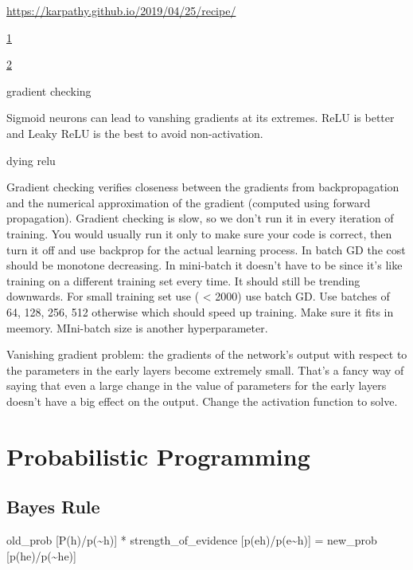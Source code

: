 \documentclass[]{book}
\begin{document}
\url{https://karpathy.github.io/2019/04/25/recipe/}

\href{http://theorangeduck.com/page/neural-network-not-working}{1}

\href{https://towardsdatascience.com/checklist-for-debugging-neural-networks-d8b2a9434f21}{2}

gradient checking

Sigmoid neurons can lead to vanshing gradients at its extremes. ReLU is better and Leaky ReLU is the best to avoid non-activation.

dying relu

Gradient checking verifies closeness between the gradients from backpropagation and the numerical approximation of the gradient (computed using forward propagation). Gradient checking is slow, so we don't run it in every iteration of training. You would usually run it only to make sure your code is correct, then turn it off and use backprop for the actual learning process. In batch GD the cost should be monotone decreasing. In mini-batch it doesn't have to be since it's like training on a different training set every time. It should still be trending downwards. For small training set use ( \textless{} 2000) use batch GD. Use batches of 64, 128, 256, 512 otherwise which should speed up training. Make sure it fits in meemory. MIni-batch size is another hyperparameter.

Vanishing gradient problem: the gradients of the network's output with respect to the parameters in the early layers become extremely small. That's a fancy way of saying that even a large change in the value of parameters for the early layers doesn't have a big effect on the output. Change the activation function to solve.

\hypertarget{probabilistic-programming}{%
\chapter{Probabilistic Programming}\label{probabilistic-programming}}

\hypertarget{bayes-rule}{%
\section{Bayes Rule}\label{bayes-rule}}

old\_prob {[}P(h)/p(\textasciitilde{}h){]} * strength\_of\_evidence {[}p(e\textbar{}h)/p(e\textbar{}\textasciitilde{}h){]} = new\_prob {[}p(h\textbar{}e)/p(\textasciitilde{}h\textbar{}e){]}
\end{document}
